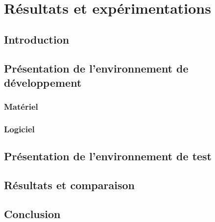 \chapter{Résultats et expérimentations}
\section{Introduction}
\section{Présentation de l’environnement de développement}
\subsection{Matériel}

\subsection{Logiciel}
\section{Présentation de l’environnement de test}
\section{Résultats et comparaison}

\section{Conclusion}
